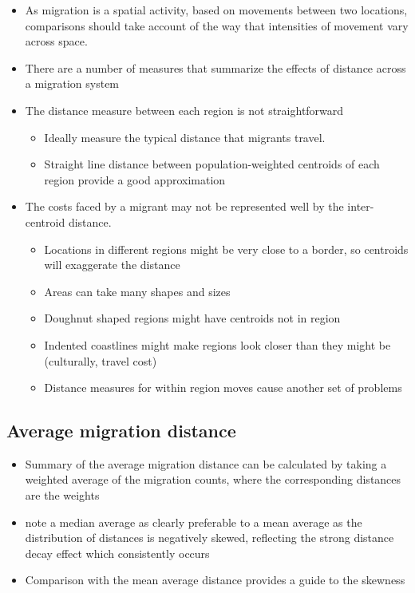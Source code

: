 \documentclass[
]{book}
\providecommand{\tightlist}{%
  \setlength{\itemsep}{0pt}\setlength{\parskip}{0pt}}
\begin{document}
\begin{itemize}
\tightlist
\item
  As migration is a spatial activity, based on movements between two locations, comparisons should take account of the way that intensities of movement vary across space.
\item
  There are a number of measures that summarize the effects of distance across a migration system
\item
  The distance measure between each region is not straightforward

  \begin{itemize}
  \tightlist
  \item
    Ideally measure the typical distance that migrants travel.
  \item
    Straight line distance between population-weighted centroids of each region provide a good approximation
  \end{itemize}
\item
  The costs faced by a migrant may not be represented well by the inter-centroid distance.

  \begin{itemize}
  \tightlist
  \item
    Locations in different regions might be very close to a border, so centroids will exaggerate the distance
  \item
    Areas can take many shapes and sizes
  \item
    Doughnut shaped regions might have centroids not in region
  \item
    Indented coastlines might make regions look closer than they might be (culturally, travel cost)
  \item
    Distance measures for within region moves cause another set of problems
  \end{itemize}
\end{itemize}

\hypertarget{average-migration-distance}{%
\subsection{Average migration distance}\label{average-migration-distance}}

\begin{itemize}
\tightlist
\item
  Summary of the average migration distance can be calculated by taking a weighted average of the migration counts, where the corresponding distances are the weights
\item
  \citet{Bell2002} note a median average as clearly preferable to a mean average as the distribution of distances is negatively skewed, reflecting the strong distance decay effect which consistently occurs
\item
  Comparison with the mean average distance provides a guide to the skewness
\end{itemize}
\end{document}
